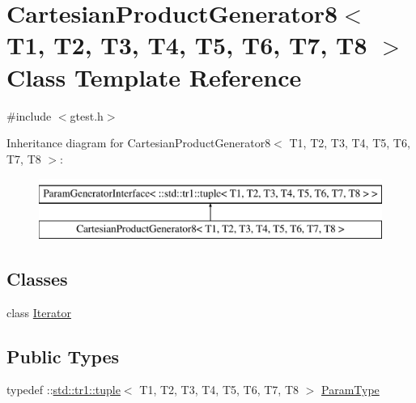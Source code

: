 \hypertarget{classtesting_1_1internal_1_1CartesianProductGenerator8}{\section{\-Cartesian\-Product\-Generator8$<$ \-T1, \-T2, \-T3, \-T4, \-T5, \-T6, \-T7, \-T8 $>$ \-Class \-Template \-Reference}
\label{df/dcc/classtesting_1_1internal_1_1CartesianProductGenerator8}
}


{\ttfamily \#include $<$gtest.\-h$>$}

\-Inheritance diagram for \-Cartesian\-Product\-Generator8$<$ \-T1, \-T2, \-T3, \-T4, \-T5, \-T6, \-T7, \-T8 $>$\-:\begin{figure}[H]
\begin{center}
\leavevmode
\includegraphics[height=2.000000cm]{df/dcc/classtesting_1_1internal_1_1CartesianProductGenerator8}
\end{center}
\end{figure}
\subsection*{\-Classes}
\begin{DoxyCompactItemize}
\item 
class \hyperlink{classtesting_1_1internal_1_1CartesianProductGenerator8_1_1Iterator}{\-Iterator}
\end{DoxyCompactItemize}
\subsection*{\-Public \-Types}
\begin{DoxyCompactItemize}
\item 
typedef \-::\hyperlink{classstd_1_1tr1_1_1tuple}{std\-::tr1\-::tuple}$<$ \-T1, \*
\-T2, \-T3, \-T4, \-T5, \-T6, \-T7, \-T8 $>$ \hyperlink{classtesting_1_1internal_1_1CartesianProductGenerator8_a1323810362151af79d39617fabdcade1}{\-Param\-Type}
\end{DoxyCompactItemize}
